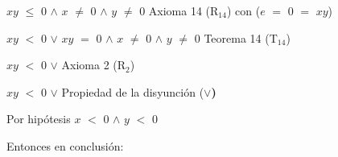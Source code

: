 \documentclass[12pt]{article}
\begin{document}
$xy$ $\leq$ $0$ \hspace{0.2cm} $\wedge$ \hspace{0.2cm} $x$ $\neq$ $0$  \hspace{0.2cm} $\wedge$ \hspace{0.2cm} $y$ $\neq$ $0$ \hspace{2.4cm} {\textcolor{carrotorange}{Axioma 14 (R$_{14}$) con ($e$ $=$ $0$ $=$ $xy$)}} \vspace{0.5cm}

$xy$ $<$ $0$ \hspace{0.2cm} $\vee$ \hspace{0.2cm} $xy$ $=$ $0$ \hspace{0.2cm} $\wedge$ \hspace{0.2cm}  $x$ $\neq$ $0$  \hspace{0.2cm} $\wedge$ \hspace{0.2cm} $y$ $\neq$ $0$ \hspace{1.6cm} {\textcolor{carrotorange}{Teorema 14 (T$_{14}$)}} \vspace{0.5cm}

$xy$ $<$ $0$ \hspace{0.2cm} $\vee$ \hspace{0.2cm} {} \hspace{0.7cm} {\textcolor{carrotorange}{Axioma 2 (R$_{2}$)}}

\hspace{4.5cm} {} \vspace{0.5cm}

$xy$ $<$ $0$ \hspace{0.2cm} $\vee$ \hspace{0.2cm} {} \hspace{6.8cm} {\textcolor{carrotorange}{Propiedad de la disyunción ({\Large{{\bf{$\vee$)}}}}}} \vspace{0.5cm}

{\textcolor{palatinateblue}{Por hipótesis} $x$ $<$ $0$ $\wedge$ $y$ $<$ $0$} \vspace{0.5cm}

{\textcolor{palatinateblue}{Entonces en conclusión:}}
\end{document}
